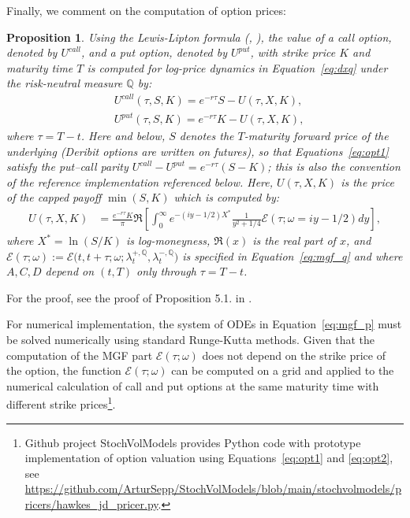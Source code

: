 \documentclass[11pt,a4paper]{article}
\numberwithin{equation}{section}
\newtheorem{proposition}[theorem]{Proposition}
\theoremstyle{remark}
\theoremstyle{definition}
\newcommand{\q}{{\mathbb Q}}
\newcommand{\lQp}{\lambda^{+,\q}}
\newcommand{\lQm}{\lambda^{-,\q}}
\newcommand{\Ec}{\mathcal{E}}
\begin{document}
Finally, we comment on the computation of option prices:
\begin{proposition}
\label{prop:option_pricing}
Using the Lewis-Lipton formula (\cite{Lewis2001}, \cite{Lipton2002}), the value of a call option, denoted by $U^{call}$, and a put option, denoted by $U^{put}$, with strike price $K$ and maturity time $T$ is computed for log-price dynamics in Equation~\eqref{eq:dxq} under the risk-neutral measure $\mathbb{Q}$ by:
\begin{equation} \label{eq:opt1}
\begin{split}
  & U^{call}(\tau, S,K)  = e^{-r\tau}S- U(\tau, X, K), \\
	& U^{put}(\tau, S,K)  = e^{-r\tau} K - U(\tau, X, K),
\end{split}
\end{equation}
where $\tau=T-t$. Here and below, $S$ denotes the $T$-maturity forward price of the underlying (Deribit options are written on futures), so that Equations~\eqref{eq:opt1} satisfy the put--call parity $U^{call}-U^{put}=e^{-r\tau}(S-K)$; this is also the convention of the reference implementation referenced below. Here, $U(\tau, X, K)$ is the price of the capped payoff $\min(S,K)$ which is computed by:
\begin{equation} \label{eq:opt2}
\begin{split}
  U(\tau, X, K)&  = \frac{e^{-r\tau} K}{\pi} \Re\left[\int^{\infty}_{0} e^{-(iy-1/2) X^{*}}  \frac{1}{y^{2}+1/4} \Ec(\tau; \omega=iy-1/2)dy\right],
\end{split}
\end{equation}
where $X^{*}=\ln(S/K)$ is log-moneyness, $\Re(x)$ is the real part of
$x$, and
$\Ec(\tau;\omega):=\Ec\big(t,t+\tau;\omega;\lQp_t,\lQm_t\big)$
  is specified in Equation~\eqref{eq:mgf_q}  and where
    $A,C,D$ depend on $(t,T)$ only through $\tau=T-t$.
\end{proposition}
For the proof, see the proof of Proposition 5.1. in \cite{sepprakhmonov2023}.

For numerical implementation, the system of ODEs in Equation~\eqref{eq:mgf_p} must be solved numerically using standard Runge-Kutta methods. Given that the computation of the MGF part $\Ec(\tau;\omega)$ does not depend on the strike price of the option, the function $\Ec(\tau;\omega)$ can be computed on a grid and applied to the numerical calculation of call and put options at the same maturity time with different strike prices\footnote{Github project StochVolModels provides Python code with prototype implementation of option valuation using Equations~\eqref{eq:opt1} and \eqref{eq:opt2}, see \url{https://github.com/ArturSepp/StochVolModels/blob/main/stochvolmodels/pricers/hawkes_jd_pricer.py}.}.
\end{document}
